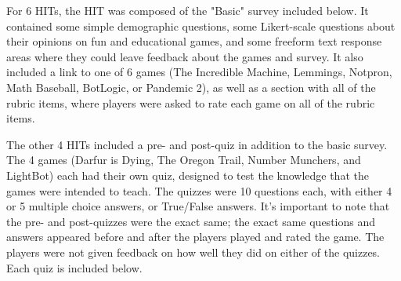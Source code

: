 		For 6 HITs, the HIT was composed of the "Basic" survey included below. It contained some simple demographic questions, some Likert-scale questions about their opinions on fun and educational games, and some freeform text response areas where they could leave feedback about the games and survey. It also included a link to one of 6 games (The Incredible Machine, Lemmings, Notpron, Math Baseball, BotLogic, or Pandemic 2), as well as a section with all of the rubric items, where players were asked to rate each game on all of the rubric items.

		The other 4 HITs included a pre- and post-quiz in addition to the basic survey. The 4 games (Darfur is Dying, The Oregon Trail, Number Munchers, and LightBot) each had their own quiz, designed to test the knowledge that the games were intended to teach. The quizzes were 10 questions each, with either 4 or 5 multiple choice answers, or True/False answers. It's important to note that the pre- and post-quizzes were the exact same; the exact same questions and answers appeared before and after the players played and rated the game. The players were not given feedback on how well they did on either of the quizzes. Each quiz is included below.  






\newpage
	

